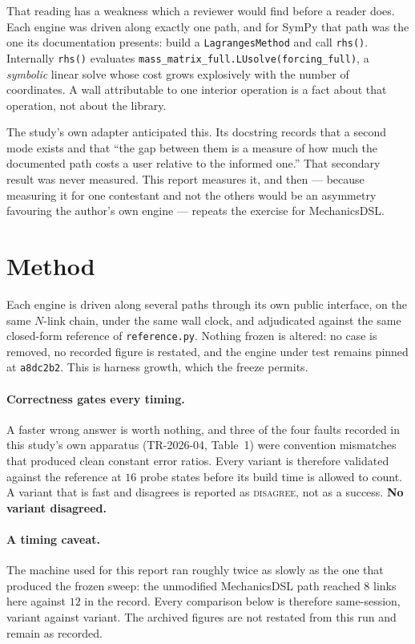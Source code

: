 \documentclass[11pt,a4paper]{article}
\newcommand{\code}[1]{\texttt{\small #1}}
\begin{document}
That reading has a weakness which a reviewer would find before a reader does.
Each engine was driven along exactly one path, and for SymPy that path was the
one its documentation presents: build a \code{LagrangesMethod} and call
\code{rhs()}. Internally \code{rhs()} evaluates
\code{mass\_matrix\_full.LUsolve(forcing\_full)}, a \emph{symbolic} linear solve
whose cost grows explosively with the number of coordinates. A wall attributable
to one interior operation is a fact about that operation, not about the library.

The study's own adapter anticipated this. Its docstring records that a second
mode exists and that ``the gap between them is a measure of how much the
documented path costs a user relative to the informed one.'' That secondary
result was never measured. This report measures it, and then --- because
measuring it for one contestant and not the others would be an asymmetry
favouring the author's own engine --- repeats the exercise for MechanicsDSL.

\section{Method}

Each engine is driven along several paths through its own public interface, on
the same $N$-link chain, under the same wall clock, and adjudicated against the
same closed-form reference of \code{reference.py}. Nothing frozen is altered:
no case is removed, no recorded figure is restated, and the engine under test
remains pinned at \code{a8dc2b2}. This is harness growth, which the freeze
permits.

\paragraph{Correctness gates every timing.}
A faster wrong answer is worth nothing, and three of the four faults recorded in
this study's own apparatus (TR-2026-04, Table~1) were convention mismatches that
produced clean constant error ratios. Every variant is therefore validated
against the reference at $16$ probe states before its build time is allowed to
count. A variant that is fast and disagrees is reported as \textsc{disagree},
not as a success. \textbf{No variant disagreed.}

\paragraph{A timing caveat.}
The machine used for this report ran roughly twice as slowly as the one that
produced the frozen sweep: the unmodified MechanicsDSL path reached $8$ links
here against $12$ in the record. Every comparison below is therefore
same-session, variant against variant. The archived figures are not restated
from this run and remain as recorded.
\end{document}

